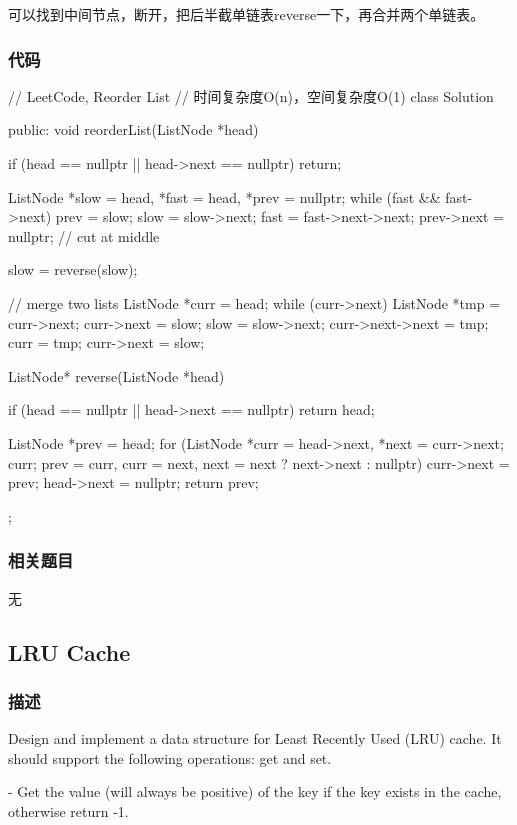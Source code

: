 可以找到中间节点，断开，把后半截单链表reverse一下，再合并两个单链表。


\subsubsection{代码}
\begin{Code}
	// LeetCode, Reorder List
	// 时间复杂度O(n)，空间复杂度O(1)
	class Solution {
		public:
		void reorderList(ListNode *head) {
			if (head == nullptr || head->next == nullptr) return;
			
			ListNode *slow = head, *fast = head, *prev = nullptr;
			while (fast && fast->next) {
				prev = slow;
				slow = slow->next;
				fast = fast->next->next;
			}
			prev->next = nullptr; // cut at middle
			
			slow = reverse(slow);
			
			// merge two lists
			ListNode *curr = head;
			while (curr->next) {
				ListNode *tmp = curr->next;
				curr->next = slow;
				slow = slow->next;
				curr->next->next = tmp;
				curr = tmp;
			}
			curr->next = slow;
		}
		
		ListNode* reverse(ListNode *head) {
			if (head == nullptr || head->next == nullptr) return head;
			
			ListNode *prev = head;
			for (ListNode *curr = head->next, *next = curr->next; curr;
			prev = curr, curr = next, next = next ? next->next : nullptr) {
				curr->next = prev;
			}
			head->next = nullptr;
			return prev;
		}
	};
\end{Code}


\subsubsection{相关题目}
\begindot
\item 无
\myenddot


\subsection{LRU Cache}
\label{sec:LRU-Cachet}


\subsubsection{描述}
Design and implement a data structure for Least Recently Used (LRU) cache. It 
should support the following operations: get and set.

 - Get the value (will always be positive) of the key if the key 
exists in the cache, otherwise return -1.

